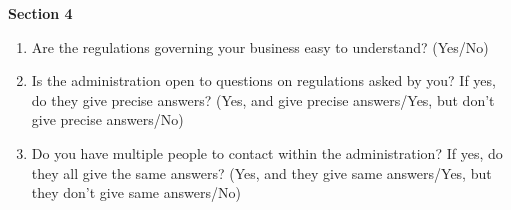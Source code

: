 \documentclass[a4paper, 12pt]{article}
\begin{document}
\begin{mdframed}[backgroundcolor=gray!20]
\begin{enumerate}[noitemsep]
\end{enumerate}
\textbf {Section 4}
\begin{enumerate}[noitemsep]
\item Are the regulations governing your business easy to understand? (Yes/No)
\item Is the administration open to questions on regulations asked by you? If yes, do they give precise answers? (Yes, and give precise answers/Yes, but don’t give precise answers/No)
\item Do you have multiple people to contact within the administration? If yes, do they all give the same answers? (Yes, and they give same answers/Yes, but they don’t give same 
answers/No)
\end{enumerate} 
\end{mdframed}

\small
\newpage
\end{document}
